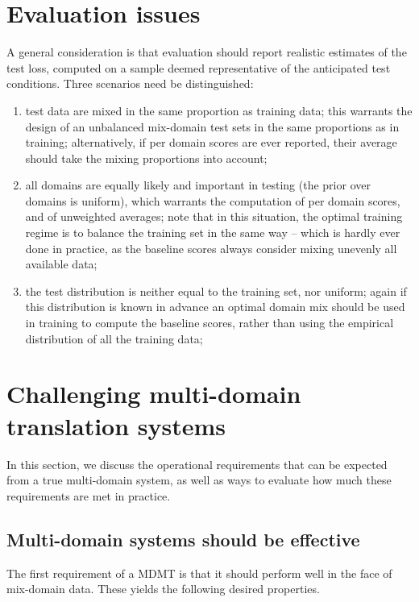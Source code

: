 \documentclass[11pt]{article}
\begin{document}
\section{Evaluation issues \label{sec:evaluation}}

A general consideration is that evaluation should report realistic estimates of the test loss, computed on a sample deemed representative of the anticipated test conditions. Three scenarios need be distinguished:
\begin{enumerate}
\item test data are mixed in the same proportion as training data; this warrants the design of an unbalanced mix-domain test sets in the same proportions as in training; alternatively, if per domain scores are ever reported, their average should take the mixing proportions into account;
\item all domains are equally likely and important in testing (the prior over domains is uniform), which warrants the computation of per domain scores, and of unweighted averages; note that in this situation, the optimal training regime is to balance the training set in the same way -- which is hardly ever done in practice, as the baseline scores always consider mixing unevenly all available data;
\item the test distribution is neither equal to the training set, nor uniform; again if this distribution is known in advance an optimal domain mix should be used in training to compute the baseline scores, rather than using the empirical distribution of all the training data;
\end{enumerate}

\section{Challenging multi-domain translation systems}
In this section, we discuss the operational requirements that can be expected from a true multi-domain system, as well as ways to evaluate how much these requirements are met in practice.

\subsection{Multi-domain systems should be effective \label{ssec:effective}}
The first requirement of a MDMT is that it should perform well in the face of mix-domain data. These yields the following desired properties.
\end{document}
